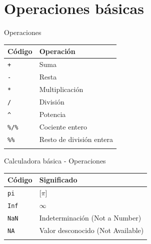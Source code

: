 \documentclass[
  ignorenonframetext,
]{beamer}
\begin{document}
\section{Operaciones básicas}\label{operaciones-buxe1sicas}

\begin{frame}[fragile]{Operaciones}
\label{operaciones}
\begin{longtable}[]{@{}ll@{}}
\toprule\noalign{}
Código & Operación \\
\midrule\noalign{}
\endhead
\texttt{+} & Suma \\
\texttt{-} & Resta \\
\texttt{*} & Multiplicación \\
\texttt{/} & División \\
\texttt{\^{}} & Potencia \\
\texttt{\%/\%} & Cociente entero \\
\texttt{\%\%} & Resto de división entera \\
\bottomrule\noalign{}
\end{longtable}
\end{frame}

\begin{frame}[fragile]{Calculadora básica - Operaciones}
\label{calculadora-buxe1sica---operaciones}
\begin{longtable}[]{@{}ll@{}}
\toprule\noalign{}
Código & Significado \\
\midrule\noalign{}
\endhead
\texttt{pi} & {[}\(\pi\){]} \\
\texttt{Inf} &
\href{https://es.wikipedia.org/wiki/Infinito}{\(\infty\)} \\
\texttt{NaN} & Indeterminación (Not a Number) \\
\texttt{NA} & Valor desconocido (Not Available) \\
\bottomrule\noalign{}
\end{longtable}
\end{frame}
\end{document}
